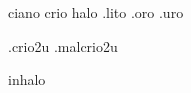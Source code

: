 % 
%

\begin{prefixos}
ciano crio halo .lito
.oro .uro
\end{prefixos}

.crio2u .malcrio2u
\begin{3a_ppi}
inhalo
\end{3a_ppi}
\endinput
